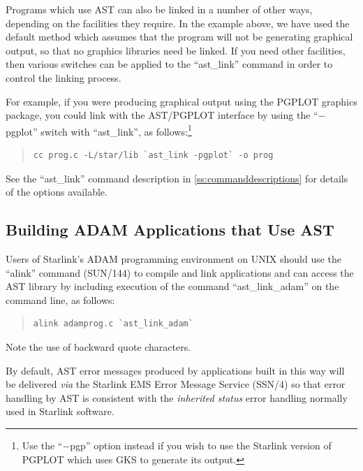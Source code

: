 \documentclass[twoside,11pt]{article}
\newcommand{\htmlref}[2]{#1}
\newcommand{\xref}[3]{#1}
\newcommand{\appref}[1]{Appendix~\ref{#1}}
\renewcommand{\appref}[1]{\ref{#1}}
\begin{document}
Programs which use AST can also be linked in a number of other ways,
depending on the facilities they require. In the example above, we
have used the default method which assumes that the program will not
be generating graphical output, so that no graphics libraries need be
linked. If you need other facilities, then various switches can be
applied to the ``ast\_link'' command in order to control the linking
process.

For example, if you were producing graphical output using the PGPLOT
graphics package, you could link with the AST/PGPLOT interface by
using the ``$-$pgplot'' switch with ``ast\_link'', as
follows:\footnote{Use the ``$-$pgp'' option instead if you wish to use
the Starlink version of PGPLOT which uses GKS to generate its output.}

\begin{quote}
\small
\begin{verbatim}
cc prog.c -L/star/lib `ast_link -pgplot` -o prog
\end{verbatim}
\normalsize
\end{quote}

See the ``ast\_link'' command description in
\appref{ss:commanddescriptions} for details of the options available.

\subsection{Building ADAM Applications that Use AST}

Users of Starlink's \xref{ADAM}{sg4}{} programming environment
 on UNIX should use the
``\xref{alink}{sun144}{ADAM_link_scripts}'' command
(\xref{SUN/144}{sun144}{}) to compile and link applications and can
access the AST library by including execution of the command
``\htmlref{ast\_link\_adam}{ast_link_adam}'' on the command line, as follows:

\begin{quote}
\small
\begin{verbatim}
alink adamprog.c `ast_link_adam`
\end{verbatim}
\normalsize
\end{quote}

Note the use of backward quote characters.

By default, AST error messages produced by applications built in this
way will be delivered {\em{via}} the Starlink EMS Error Message
Service (\xref{SSN/4}{ssn4}{}) so that error handling by AST is
consistent with the \xref{{\em{inherited
status}}}{sun104}{inherited_status} error handling normally used in
Starlink software.
\end{document}
